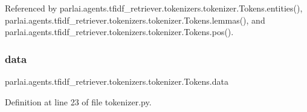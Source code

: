 Referenced by parlai.\+agents.\+tfidf\+\_\+retriever.\+tokenizers.\+tokenizer.\+Tokens.\+entities(), parlai.\+agents.\+tfidf\+\_\+retriever.\+tokenizers.\+tokenizer.\+Tokens.\+lemmas(), and parlai.\+agents.\+tfidf\+\_\+retriever.\+tokenizers.\+tokenizer.\+Tokens.\+pos().

\mbox{\label{classparlai_1_1agents_1_1tfidf__retriever_1_1tokenizers_1_1tokenizer_1_1Tokens_ad5068b92d72245d43fd75dbb4c070a27}} 
\subsubsection{\texorpdfstring{data}{data}}
{\footnotesize\ttfamily parlai.\+agents.\+tfidf\+\_\+retriever.\+tokenizers.\+tokenizer.\+Tokens.\+data}



Definition at line 23 of file tokenizer.\+py.



